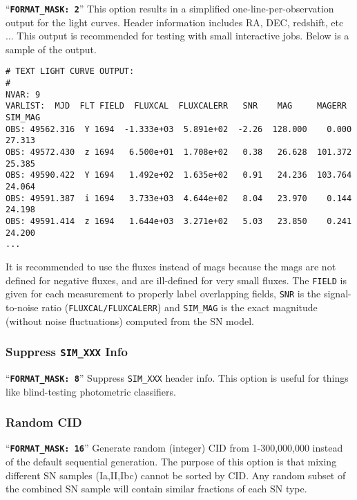 \documentclass[12pt]{article}
\newcommand{\obs}{observation}
\newcommand{\MXSIM}{300,000,000}
\begin{document}
``{\tt\bf FORMAT\_MASK:  2}'' 
This  option results in a simplified one-line-per-{\obs} 
output for the light curves. Header information includes 
RA, DEC, redshift, etc ...
This output is recommended for testing with small interactive jobs.
Below is a sample of the output.
%
\begin{Verbatim}[frame=single]
# TEXT LIGHT CURVE OUTPUT: 
#
NVAR: 9 
VARLIST:  MJD  FLT FIELD  FLUXCAL  FLUXCALERR   SNR    MAG     MAGERR  SIM_MAG
OBS: 49562.316  Y 1694  -1.333e+03  5.891e+02  -2.26  128.000    0.000  27.313
OBS: 49572.430  z 1694   6.500e+01  1.708e+02   0.38   26.628  101.372  25.385
OBS: 49590.422  Y 1694   1.492e+02  1.635e+02   0.91   24.236  103.764  24.064
OBS: 49591.387  i 1694   3.733e+03  4.644e+02   8.04   23.970    0.144  24.198
OBS: 49591.414  z 1694   1.644e+03  3.271e+02   5.03   23.850    0.241  24.200
...
\end{Verbatim}
%
It is recommended to use the fluxes instead of mags because
the mags are not defined for negative fluxes, and are ill-defined
for very small fluxes.
The {\tt FIELD} is given for each measurement to properly label
overlapping fields, {\tt SNR} is the signal-to-noise ratio
({\tt FLUXCAL/FLUXCALERR}) and  {\tt SIM\_MAG} is the exact 
magnitude (without noise fluctuations) computed from the SN model.


   \subsubsection{Suppress {\tt SIM\_XXX} Info}
   \label{sss:blind_test}
``{\tt\bf FORMAT\_MASK:  8}'' 
Suppress {\tt SIM\_XXX} header info. This option is
useful for things like blind-testing photometric
classifiers.

   \subsubsection{Random CID}
   \label{sss:random_CID}
``{\tt\bf FORMAT\_MASK:  16}'' 
Generate random (integer) CID  from 1-{\MXSIM} instead
of the default sequential generation.
The purpose of this option is that mixing different SN samples 
(Ia,II,Ibc) cannot be sorted by CID. Any random subset of the
combined SN sample will contain similar fractions of each 
SN type.
\end{document}
